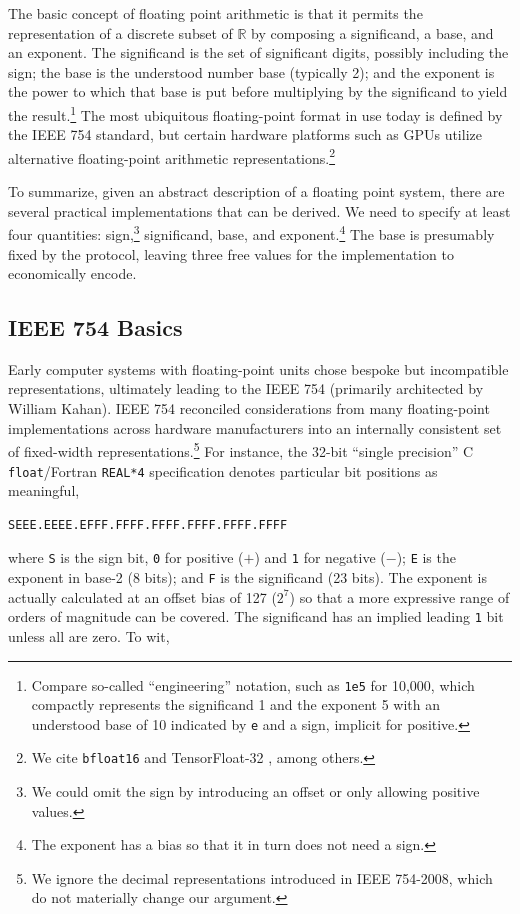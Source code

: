 \documentclass[twoside]{article}
\begin{document}
The basic concept of floating point arithmetic is that it permits the representation of a discrete subset of $\mathbb{R}$ by composing a significand, a base, and an exponent.  The significand is the set of significant digits, possibly including the sign; the base is the understood number base (typically 2); and the exponent is the power to which that base is put before multiplying by the significand to yield the result.\footnote{Compare so-called “engineering” notation, such as \texttt{1e5} for 10,000, which compactly represents the significand 1 and the exponent 5 with an understood base of 10 indicated by \texttt{e} and a sign, implicit for positive.}  The most ubiquitous floating-point format in use today is defined by the IEEE 754 standard, but certain hardware platforms such as GPUs utilize alternative floating-point arithmetic representations.\footnote{We cite \texttt{bfloat16} \citep{Wang2019} and TensorFloat-32 \citep{Kharva2020}, among others.}

To summarize, given an abstract description of a floating point system, there are several practical implementations that can be derived.  We need to specify at least four quantities:  sign,\footnote{We could omit the sign by introducing an offset or only allowing positive values.} significand, base, and exponent.\footnote{The exponent has a bias so that it in turn does not need a sign.}  The base is presumably fixed by the protocol, leaving three free values for the implementation to economically encode.


\subsection{IEEE 754 Basics}

Early computer systems with floating-point units chose bespoke but incompatible representations, ultimately leading to the IEEE 754 (primarily architected by William Kahan).  IEEE 754 reconciled considerations from many floating-point implementations across hardware manufacturers into an internally consistent set of fixed-width representations.\footnote{We ignore the decimal representations introduced in IEEE 754-2008, which do not materially change our argument.}  For instance, the 32-bit “single precision” C \texttt{float}/Fortran \texttt{REAL*4} specification denotes particular bit positions as meaningful,

\begin{lstlisting}[style=listingcode]
SEEE.EEEE.EFFF.FFFF.FFFF.FFFF.FFFF.FFFF
\end{lstlisting}
\noindent
where \texttt{S} is the sign bit, \texttt{0} for positive ($+$) and \texttt{1} for negative ($-$); \texttt{E} is the exponent in base-2 (8 bits); and \texttt{F} is the significand (23 bits).  The exponent is actually calculated at an offset bias of 127 ($2^{7}$) so that a more expressive range of orders of magnitude can be covered.  The significand has an implied leading \texttt{1} bit unless all are zero.  To wit,
\end{document}
